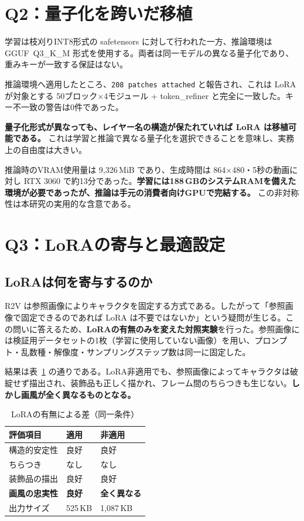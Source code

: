 \documentclass[10pt,twocolumn]{ltjsarticle}
\begin{document}
\section{Q2：量子化を跨いだ移植}

学習は枝刈りINT8形式の safetensors に対して行われた一方、推論環境は GGUF~Q3\_K\_M 形式を使用する。両者は同一モデルの異なる量子化であり、重みキーが一致する保証はない。

推論環境へ適用したところ、\texttt{208 patches attached} と報告され、これは LoRA が対象とする 50ブロック$\times$4モジュール + token\_refiner と完全に一致した。キー不一致の警告は0件であった。

\textbf{量子化形式が異なっても、レイヤー名の構造が保たれていれば LoRA は移植可能である。} これは学習と推論で異なる量子化を選択できることを意味し、実務上の自由度は大きい。

推論時のVRAM使用量は 9{,}326\,MiB であり、生成時間は 864$\times$480・5秒の動画に対し RTX 3060 で約13分であった。\textbf{学習には188\,GBのシステムRAMを備えた環境が必要であったが、推論は手元の消費者向けGPUで完結する。} この非対称性は本研究の実用的な含意である。

\section{Q3：LoRAの寄与と最適設定}

\subsection{LoRAは何を寄与するのか}

R2V は参照画像によりキャラクタを固定する方式である。したがって「参照画像で固定できるのであれば LoRA は不要ではないか」という疑問が生じる。この問いに答えるため、\textbf{LoRAの有無のみを変えた対照実験}を行った。参照画像には検証用データセットの1枚（学習に使用していない画像）を用い、プロンプト・乱数種・解像度・サンプリングステップ数は同一に固定した。

結果は表~\ref{tab:ablation} の通りである。LoRA非適用でも、参照画像によってキャラクタは破綻せず描出され、装飾品も正しく描かれ、フレーム間のちらつきも生じない。\textbf{しかし画風が全く異なるものとなる。}

\begin{table}[t]
\centering\small
\caption{LoRAの有無による差（同一条件）}
\label{tab:ablation}
\begin{tabular}{lll}
\toprule
評価項目 & 適用 & 非適用 \\
\midrule
構造的安定性 & 良好 & 良好 \\
ちらつき & なし & なし \\
装飾品の描出 & 良好 & 良好 \\
\textbf{画風の忠実性} & \textbf{良好} & \textbf{全く異なる} \\
出力サイズ & 525\,KB & 1{,}087\,KB \\
\bottomrule
\end{tabular}
\end{table}
\end{document}
